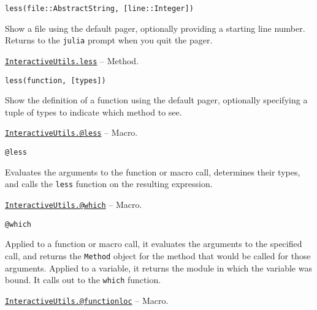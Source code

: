 \begin{adjustwidth}{2em}{0pt}


\begin{verbatim}
less(file::AbstractString, [line::Integer])
\end{verbatim}

Show a file using the default pager, optionally providing a starting line number. Returns to the \texttt{julia} prompt when you quit the pager.



\end{adjustwidth}
\hypertarget{16005681522948418287}{} 
\hyperlink{16005681522948418287}{\texttt{InteractiveUtils.less}}  -- {Method.}

\begin{adjustwidth}{2em}{0pt}


\begin{verbatim}
less(function, [types])
\end{verbatim}

Show the definition of a function using the default pager, optionally specifying a tuple of types to indicate which method to see.



\end{adjustwidth}
\hypertarget{8935326068247481160}{} 
\hyperlink{8935326068247481160}{\texttt{InteractiveUtils.@less}}  -- {Macro.}

\begin{adjustwidth}{2em}{0pt}


\begin{verbatim}
@less
\end{verbatim}

Evaluates the arguments to the function or macro call, determines their types, and calls the \texttt{less} function on the resulting expression.



\end{adjustwidth}
\hypertarget{5196080466457876497}{} 
\hyperlink{5196080466457876497}{\texttt{InteractiveUtils.@which}}  -- {Macro.}

\begin{adjustwidth}{2em}{0pt}


\begin{verbatim}
@which
\end{verbatim}

Applied to a function or macro call, it evaluates the arguments to the specified call, and returns the \texttt{Method} object for the method that would be called for those arguments. Applied to a variable, it returns the module in which the variable was bound. It calls out to the \texttt{which} function.



\end{adjustwidth}
\hypertarget{12812718888833665191}{} 
\hyperlink{12812718888833665191}{\texttt{InteractiveUtils.@functionloc}}  -- {Macro.}

